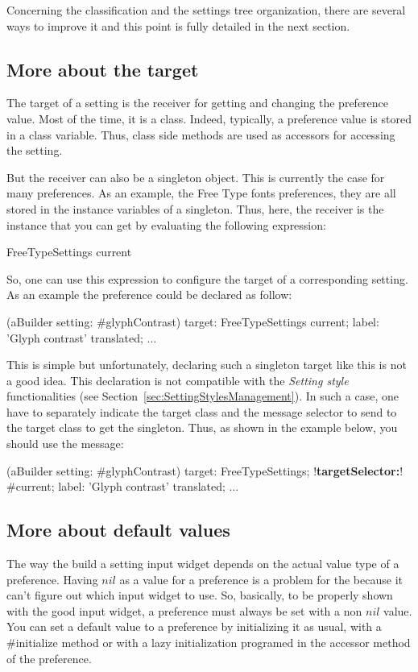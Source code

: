 \documentclass[a4paper,10pt,twoside]{book}
\begin{document}
Concerning the classification and the settings tree organization, there are several ways to improve it and this point is fully detailed in the next section.

\subsection{More about the target}

The target of a setting is the receiver for getting and changing the preference value. Most of the time, it is a class. Indeed, typically, a preference value is stored in a class variable. Thus, class side methods are used as accessors for accessing the setting. 

But the receiver can also be a singleton object. This is currently the case for many preferences. As an example, the Free Type fonts preferences, they are all stored in the instance variables of a  singleton. Thus, here, the receiver is the  instance that you can get by evaluating the following expression:
\begin{code}{}
FreeTypeSettings current
\end{code}
So, one can use this expression  to configure the target of a corresponding setting. As an example the  preference could be declared as follow:
\begin{code}{}
(aBuilder setting: #glyphContrast) 
	target: FreeTypeSettings current;
	label: 'Glyph contrast' translated;
    ...
\end{code}
This is simple but unfortunately, declaring such a singleton target like this is not a good idea. This declaration is not compatible with the \textit{Setting style} functionalities (see Section~\ref{sec:SettingStylesManagement}). In such a case, one have to separately indicate the target class and the message selector to send to the target class to get the singleton. Thus, as shown in the example below, you should use the  message:

\begin{code}{}
(aBuilder setting: #glyphContrast) 
	target: FreeTypeSettings;
	!\textbf{targetSelector:}! #current;
	label: 'Glyph contrast' translated;
    ...
\end{code}

\subsection{More about default values}
The way the \setbrowser build a setting input widget depends on the actual value type of a preference. Having $nil$ as a value for a preference is a problem for the \setbrowser because it can't figure out which input widget to use.
So, basically, to be properly shown with the good input widget, a preference must always be set with a non $nil$ value.
You can set a default value to a preference by initializing it as usual, with a \#initialize method or with a lazy initialization programed in the accessor method of the preference. 
\end{document}
